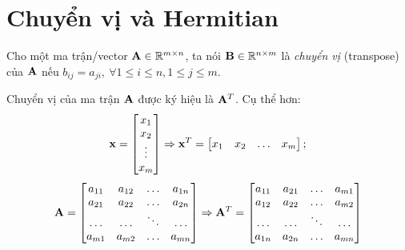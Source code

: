\section{Chuyển vị và Hermitian} %
\label{sec:chuyen_vi}


Cho một ma trận/vector $\mathbf{A} \in \mathbb{R}^{m\times n}$, ta nói $\mathbf{B} \in \mathbb{R}^{n\times m}$ là \textit{chuyển vị} (transpose) của
$\mathbf{A}$ nếu $b_{ij} = a_{ji},~\forall 1 \leq i \leq n, 1 \leq j\leq m$.

Chuyển vị của ma trận $\mathbf{A}$ được ký hiệu là $\mathbf{A}^T$. Cụ thể hơn:
\begin{eqnarray*}
\mathbf{x} = \left[
\begin{matrix}
x_1 \\ x_2 \\ \vdots \\ x_m
\end{matrix}
\right] \Rightarrow \mathbf{x}^T = \left[
\begin{matrix}
x_1 & x_2 & \dots & x_m
\end{matrix}
\right];
\end{eqnarray*}
\begin{eqnarray*}
\mathbf{A} = \left[
\begin{matrix}
a_{11} & a_{12} & \dots & a_{1n} \\
a_{21} & a_{22} & \dots & a_{2n} \\
\dots & \dots & \ddots & \dots \\
a_{m1} & a_{m2} & \dots & a_{mn}
\end{matrix}
\right]
\Rightarrow
\mathbf{A}^T = \left[
\begin{matrix}
a_{11} & a_{21}  &\dots & a_{m1} \\
a_{12} & a_{22}  & \dots & a_{m2} \\
\dots & \dots &  \ddots & \dots \\
a_{1n} & a_{2n} & \dots & a_{mn}
\end{matrix}
\right]
\end{eqnarray*}
